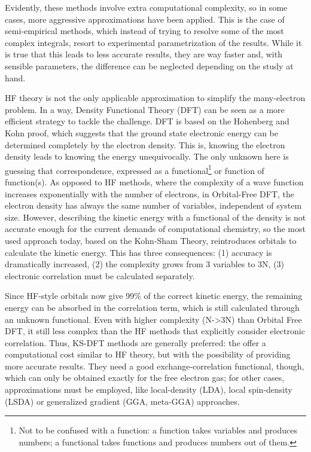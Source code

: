 Evidently, these methods involve extra computational complexity, so in some cases, more aggressive approximations have been applied. This is the case of semi-empirical methods, which instead of trying to resolve some of the most complex integrals, resort to experimental parametrization of the results. While it is true that this leads to less accurate results, they are way faster and, with sensible parameters, the difference can be neglected depending on the study at hand.

HF theory is not the only applicable approximation to simplify the many-electron problem. In a way, Density Functional Theory (DFT) can be seen as a more efficient strategy to tackle the challenge. DFT is based on the Hohenberg and Kohn proof, which suggests that the ground state electronic energy can be determined completely by the electron density. This is, knowing the electron density leads to knowing the energy unequivocally. The only unknown here is guessing that correspondence, expressed as a functional\footnote{Not to be confused with a function: a function takes variables and produces numbers; a functional takes functions and produces numbers out of them.} or function of function(s). As opposed to HF methods, where the complexity of a wave function increases exponentially with the number of electrons, in Orbital-Free DFT, the electron density has always the same number of variables, independent of system size. However, describing the kinetic energy with a functional of the density is not accurate enough for the current demands of computational chemistry, so the most used approach today, based on the Kohn-Sham Theory, reintroduces orbitals to calculate the kinetic energy. This has three consequences: (1) accuracy is dramatically increased, (2) the complexity grows from 3 variables to 3N, (3) electronic correlation must be calculated separately.

Since HF-style orbitals now give 99$\%$  of the correct kinetic energy, the remaining energy can be absorbed in the correlation term, which is still calculated through an unknown functional. Even with higher complexity (N->3N) than Orbital Free DFT, it still less complex than the HF methods that explicitly consider electronic correlation. Thus, KS-DFT methods are generally preferred: the offer a computational cost similar to HF theory, but with the possibility of providing more accurate results. They need a good exchange-correlation functional, though, which can only be obtained exactly for the free electron gas; for other cases, approximations must be employed, like local-density (LDA), local spin-density (LSDA) or generalized gradient (GGA, meta-GGA) approaches.


